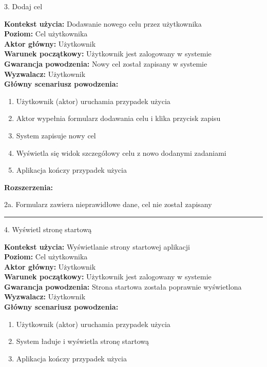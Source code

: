 {\noindent \bf{\large 3. Dodaj cel\par}}
\vspace{0.5cm}
{\noindent \bf Kontekst użycia: } Dodawanie nowego celu przez użytkownika\\
{\bf Poziom: } Cel użytkownika\\
{\bf Aktor główny: } Użytkownik\\
{\bf Warunek początkowy: } Użytkownik jest zalogowany w systemie\\
{\bf Gwarancja powodzenia: } Nowy cel został zapisany w systemie\\
{\bf Wyzwalacz: } Użytkownik\\
{\bf Główny scenariusz powodzenia: }
\begin{center}
    \begin{enumerate}
        \item Użytkownik (aktor) uruchamia przypadek użycia
        \item Aktor wypełnia formularz dodawania celu i klika przycisk zapisu
        \item System zapisuje nowy cel
        \item Wyświetla się widok szczegółowy celu z nowo dodanymi zadaniami
        \item Aplikacja kończy przypadek użycia
    \end{enumerate}
\end{center}
{\noindent \bf Rozszerzenia: }
\begin{center}
    \begin{description}
        \item{2a.} Formularz zawiera nieprawidłowe dane, cel nie został zapisany
    \end{description}
\end{center}

\noindent\rule{14cm}{0.1pt} %

{\noindent \bf{\large 4. Wyświetl stronę startową\par}}
\vspace{0.5cm}
{\noindent \bf Kontekst użycia: } Wyświetlanie strony startowej aplikacji\\
{\bf Poziom: } Cel użytkownika\\
{\bf Aktor główny: } Użytkownik\\
{\bf Warunek początkowy: } Użytkownik jest zalogowany w systemie\\
{\bf Gwarancja powodzenia: } Strona startowa została poprawnie wyświetlona\\
{\bf Wyzwalacz: } Użytkownik\\
{\bf Główny scenariusz powodzenia: }
\begin{center}
    \begin{enumerate}
        \item Użytkownik (aktor) uruchamia przypadek użycia
        \item System ładuje i wyświetla stronę startową
        \item Aplikacja kończy przypadek użycia
    \end{enumerate}
\end{center}

